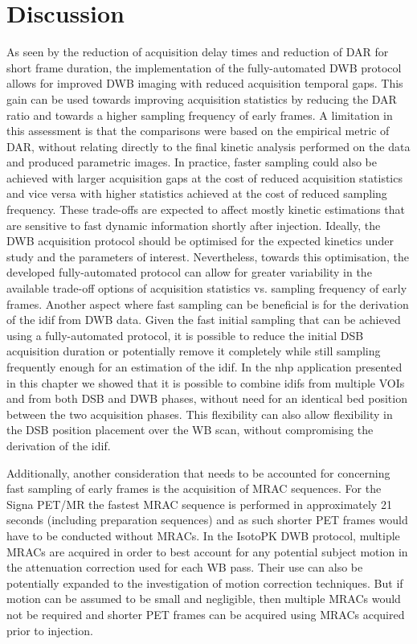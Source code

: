 \section{Discussion}

As seen by the reduction of acquisition delay times and reduction of DAR for short frame duration, the implementation of the fully-automated DWB protocol allows for improved DWB imaging with reduced acquisition temporal gaps.
%
This gain can be used towards improving acquisition statistics by reducing the DAR ratio and towards a higher sampling frequency of early frames. 
A limitation in this assessment is that the comparisons were based on the empirical metric of DAR, without relating directly to the final kinetic analysis performed on the data and produced parametric images. In practice, faster sampling could also be achieved with larger acquisition gaps at the cost of reduced acquisition statistics and vice versa with higher statistics achieved at the cost of reduced sampling frequency. 
These trade-offs are expected to affect mostly kinetic estimations that are sensitive to fast dynamic information shortly after injection. 
Ideally, the DWB acquisition protocol should be optimised for the expected kinetics under study and the parameters of interest. Nevertheless, towards this optimisation, the developed fully-automated protocol can allow for greater variability in the available trade-off options of acquisition statistics vs. sampling frequency of early frames. 
Another aspect where fast sampling can be beneficial is for the derivation of the \gls{idif} from DWB data. Given the fast initial sampling that can be achieved using a fully-automated protocol, it is possible to reduce the initial DSB acquisition duration or potentially remove it completely while still sampling frequently enough for an estimation of the \gls{idif}.
In the \gls{nhp} application presented in this chapter we showed that it is possible to combine \glspl{idif} from multiple VOIs and from both DSB and DWB phases, without need for an identical bed position between the two acquisition phases. This flexibility can also allow flexibility in the DSB position placement over the WB scan, without compromising the derivation of the \gls{idif}. 

Additionally, another consideration that needs to be accounted for concerning fast sampling of early frames is the acquisition of MRAC sequences. For the Signa PET/MR the fastest MRAC sequence is performed in approximately 21 seconds (including preparation sequences) and as such shorter PET frames would have to be conducted without MRACs. In the IsotoPK DWB protocol, multiple MRACs are acquired in order to best account for any potential subject motion in the attenuation correction used for each WB pass. Their use can also be potentially expanded to the investigation of motion correction techniques. But if motion can be assumed to be small and negligible, then multiple MRACs would not be required and shorter PET frames can be acquired using MRACs acquired prior to injection. 

